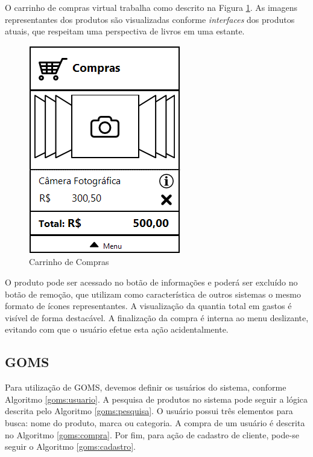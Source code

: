 \documentclass{article}
\begin{document}

O carrinho de compras virtual trabalha como descrito na Figura \ref{fig:compra}.
As imagens representantes dos produtos são visualizadas conforme
\emph{interfaces} dos produtos atuais, que respeitam uma perspectiva de livros
em uma estante.

\begin{figure}[ht]
    \centering{}
    \includegraphics[scale=0.55]{images/compra.png}
    \caption{Carrinho de Compras}
    \label{fig:compra}
\end{figure}

O produto pode ser acessado no botão de informações e poderá ser excluído no
botão de remoção, que utilizam como característica de outros sistemas o mesmo
formato de ícones representantes. A visualização da quantia total em gastos é
visível de forma destacável. A finalização da compra é interna ao menu
deslizante, evitando com que o usuário efetue esta ação acidentalmente.

\subsection{GOMS}

Para utilização de GOMS, devemos definir os usuários do sistema, conforme
Algoritmo \ref{goms:usuario}. A pesquisa de produtos no sistema pode seguir a
lógica descrita pelo Algoritmo \ref{goms:pesquisa}. O usuário possui três
elementos para busca: nome do produto, marca ou categoria. A compra de um
usuário é descrita no Algoritmo \ref{goms:compra}. Por fim, para ação de
cadastro de cliente, pode-se seguir o Algoritmo \ref{goms:cadastro}.
\end{document}
